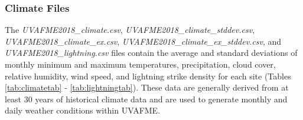 \documentclass[a4paper, 12pt] {article}
\begin{document}
\begin{table}[H]
\caption{Rangelist file parameters.}
\label{tab:rangelisttab}
\end{table}

\subsubsection{Climate Files}
The \textit{UVAFME2018\_climate.csv}, \textit{UVAFME2018\_climate\_stddev.csv}, \\
\textit{UVAFME2018\_climate\_ex.csv}, \textit{UVAFME2018\_climate\_ex\_stddev.csv}, and \textit{UVAFME2018\_lightning.csv} files contain the average and standard deviations of monthly minimum and maximum temperatures, precipitation, cloud cover, relative humidity, wind speed, and lightning strike density for each site (Tables \ref{tab:climatetab} - \ref{tab:lightningtab}). These data are generally derived from at least 30 years of historical climate data and are used to generate monthly and daily weather conditions within UVAFME.

\begin{table}[H]
\caption{\textit{UVAFME2018\_climate.csv} file parameters.}
\label{tab:climatetab}
\end{table}
\end{document}
